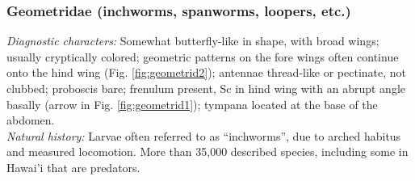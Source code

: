 \documentclass[letterpaper, 11pt]{article}
\begin{document}
\subsubsection{Geometridae (inchworms, spanworms, loopers, etc.)}
\noindent{}\textit{Diagnostic characters:} Somewhat butterfly-like in shape, with broad wings; usually cryptically colored; geometric patterns on the fore wings often continue onto the hind wing (Fig. \ref{fig:geometrid2}); antennae thread-like or pectinate, not clubbed; proboscis bare; frenulum present, Sc in hind wing with an abrupt angle basally (arrow in Fig. \ref{fig:geometrid1}); tympana located at the base of the abdomen.\\

\noindent{}\textit{Natural history:} Larvae often referred to as ``inchworms'', due to arched habitus and measured locomotion. More than 35,000 described species, including some in Hawai'i that are predators.
\end{document}
